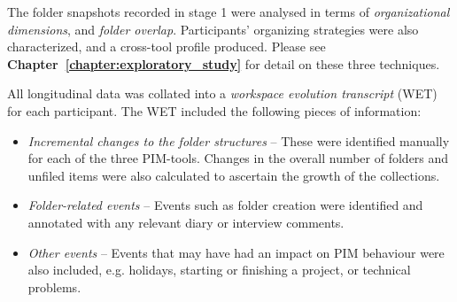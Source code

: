 The folder snapshots recorded in stage 1 were analysed in terms of \textit{organizational dimensions}, and \textit{folder overlap}.  Participants' organizing strategies were also characterized, and a cross-tool profile produced.  Please see \textbf{Chapter~\ref{chapter:exploratory_study}} for detail on these three techniques.

All longitudinal data was collated into a \textit{workspace evolution transcript} (WET) for each participant. The WET included the following pieces of information:
\begin{itemize}

\item \textit{Incremental changes to the folder structures} -- These were identified manually for each of the three PIM-tools. Changes in the overall number of folders and unfiled items were also calculated to ascertain the growth of the collections.

\item \textit{Folder-related events} -- Events such as folder creation were identified and annotated with any relevant diary or interview comments.

\item \textit{Other events} -- Events that may have had an impact on PIM behaviour were also included, e.g. holidays, starting or finishing a project, or technical problems.


\end{itemize}


